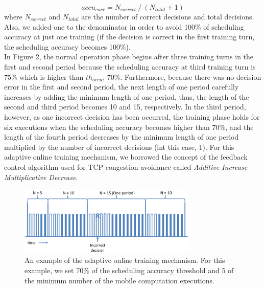 \documentclass[10pt, conference, compsocconf]{IEEEtran}
\begin{document}
{%
\begin{equation}
	accu_{curr} = N_{correct}\:/\:(N_{total} + 1)
\end{equation}
%
where $N_{correct}$ and $N_{total}$ are the number of correct decisions
and total decisions.
%
Also, we added one to the denominator in order to avoid 100\% of
scheduling accuracy at just one training (if the decision is correct in
the first training turn, the scheduling accuracy becomes 100\%).\\
%
\indent In Figure 2, the normal operation phase begins after three
training turns in the first and second period because the scheduling
accuracy at third training turn is 75\% which is higher than 
$th_{accu}$, 70\%.
%
Furthermore, because there was no decision error in the first and second
period, the next length of one period carefully increases by adding the
minimum length of one period, thus, the length of the second and third
period becomes 10 and 15, respectively.
%
In the third period, however, as one incorrect decision has been
occurred, the training phase holds for six executions when the
scheduling accuracy becomes higher than 70\%, and the length of the
fourth period decreases by the minimum length of one period multiplied
by the number of incorrect decisions (int this case, 1).
%
For this adaptive online training mechanism, we borrowed the concept of
the feedback control algorithm used for TCP congestion avoidance called
\textit{Additive Increase Multiplicative Decrease}.
%
\begin{figure}
\centering
\includegraphics[height=3.3cm, width=8.5cm]{Figure/figure2}
\caption{An example of the adaptive online training mechanism. For this
example, we set 70\% of the scheduling accuracy threshold and 5 of the
minimum number of the mobile computation executions.}
\end{figure}
%
}
\end{document}
